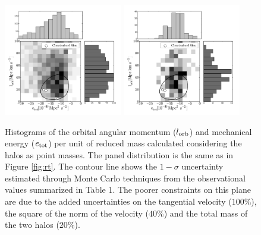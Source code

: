 \documentclass{emulateapj}
\begin{document}
\begin{figure}
\begin{center}
\includegraphics[keepaspectratio=true,width=0.46\textwidth]{./figures/test_EJ.pdf}
\includegraphics[keepaspectratio=true,width=0.46\textwidth]{./figures/test_EJ_narrow.pdf}
\caption{Histograms of the orbital angular momentum ($l_{\rm orb}$) and mechanical energy ($e_{\rm tot}$) per unit of reduced mass calculated considering the halos as point masses. The panel distribution is the same as in Figure \ref{fig:rt}. The contour line shows the $1-\sigma$ uncertainty estimated through Monte Carlo techniques from the observational values summarized in Table 1. The poorer constraints on this plane are due to the added uncertainties on the tangential velocity ($100\%$), the square of the norm of the velocity ($40\%$) and the total mass of the two halos ($20\%$). }
\label{fig:EJ}
\end{center}
\end{figure}
\end{document}
